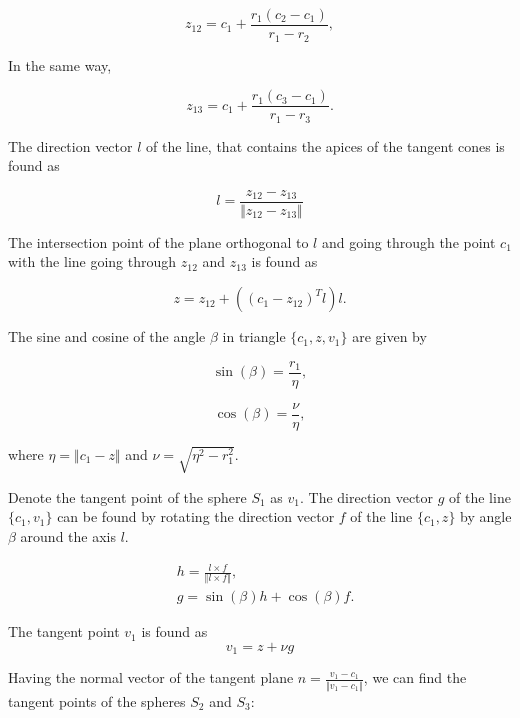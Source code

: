 \documentclass[10pt,journal,a4paper]{IEEEtran}
\begin{document}
\begin{equation}
	z_{12} = c_1 +\frac{r_1 (c_2 - c_1)}{r_1 - r_2},
\end{equation}

In the same way,

\begin{equation}
	z_{13} = c_1 +\frac{r_1 (c_3 - c_1)}{r_1 - r_3}.
\end{equation}

The direction vector $l$ of the line, that contains the apices of the tangent cones is found as

\begin{equation}
	l = \frac{z_{12} - z_{13}} {\Vert z_{12} - z_{13} \Vert} 
\end{equation}

The intersection point of the plane orthogonal to $l$ and going through the point $c_1$ with the line going through $z_{12}$ and $z_{13}$ is found as

\begin{equation}
z = z_{12} + ((c_1 - z_{12})^T l )l.
\end{equation}

The sine and cosine of the angle $\beta$ in triangle $\{c_1, z, v_1\}$ are given by 

\begin{equation}
	\sin(\beta) = \frac{r_1}{\eta},
\end{equation}

\begin{equation}
	\cos(\beta) = \frac{\nu}{\eta},
\end{equation}

where $\eta = \Vert c_1 - z \Vert $ and $\nu = \sqrt{\eta^2 -  r_1^2}$. 

Denote the tangent point of the sphere $S_1$ as $v_1$. The direction vector $g$ of the line $\{c_1, v_1\}$ can be found by rotating the direction vector $f$ of the line 
$\{c_1, z\}$ by angle $\beta$ around the axis $l$.

\begin{align}
	& h = \frac{l \times f}{\Vert l \times f \Vert}, \\
	& g = \sin(\beta) h + \cos(\beta) f.	
\end{align}

The tangent point $v_1$ is found as
\begin{equation}
v_1 = z + \nu  g
\end{equation}


Having the normal vector of the tangent plane $n = \frac{v_1 - c_1}{\Vert v_1 - c_1 \Vert}$, we can find the tangent points of the spheres $S_2$ and $S_3$:
\end{document}
